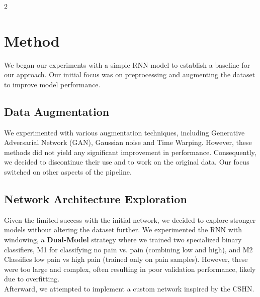 \documentclass[11pt]{article}
\begin{document}
\begin{multicols}{2}
        \section{Method}
        We began our experiments with a simple RNN model to establish a baseline for our approach. Our initial focus was on preprocessing and augmenting the dataset to improve model performance.
        \subsection{Data Augmentation}
        We experimented with various augmentation techniques, including Generative Adversarial Network (GAN), Gaussian noise and Time Warping. However, these methods did not yield any significant improvement in performance. Consequently, we decided to discontinue their use and to work on the original data.
        Our focus switched on other aspects of the pipeline.

        \subsection{Network Architecture Exploration}
        Given the limited success with the initial network, we decided to explore stronger models without altering the dataset further.
        We experimented the RNN with windowing, a \textbf{Dual-Model} strategy where we trained two specialized binary classifiers, M1 for classifying no pain vs. pain (combining low and high), and M2 Classifies low pain vs high pain (trained only on pain samples). However, these were too large and complex, often resulting in poor validation performance, likely due to overfitting.
        \\Afterward, we attempted to implement a custom network inspired by the CSHN\cite{CSHN}.

\end{multicols}
\end{document}
